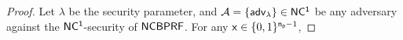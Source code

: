 \begin{proof}
Let $\lambda$ be the security parameter, and $\mathcal{A} = \{{\mathsf{adv}}_\lambda\} \in \mathsf{NC^1}$ be any adversary against the $\mathsf{NC^1}$-security of $\mathsf{NCBPRF}$. For any $\mathsf{x} \in \{0, 1\}^{\mathsf{n_p}-1}$,
%
%		

\end{proof}
